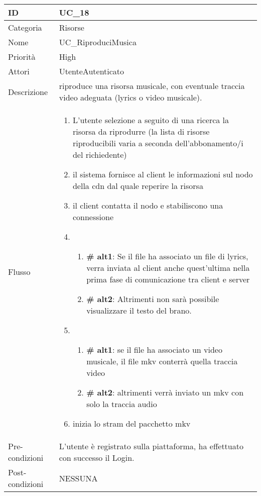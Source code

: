 \begin{center}
\begin{tabular}{ |p{2cm}|p{13cm}|  }
\hline
ID & UC\_18 \\\hline
Categoria & Risorse\\\hline
Nome & UC\_RiproduciMusica\\\hline
Priorità & High \\\hline
Attori &  UtenteAutenticato \\\hline
Descrizione & riproduce una risorsa musicale, con eventuale traccia video adeguata (lyrics o video musicale).\\\hline
Flusso &  	\begin{enumerate}
			\item L'utente selezione a seguito di una ricerca la risorsa da riprodurre (la lista di risorse riproducibili varia a seconda dell'abbonamento/i del richiedente)
			\item il sistema fornisce al client le informazioni sul nodo della cdn dal quale reperire la risorsa 
			\item il client contatta il nodo e stabiliscono una connessione
			\item \begin{enumerate}[label= ]
				\item \textbf{\# alt1}: Se il file ha associato un file di lyrics, verra inviata al client anche quest'ultima nella prima fase di comunicazione tra client e server
				\item \textbf{\# alt2}: Altrimenti non sarà possibile visualizzare il testo del brano.
			\end{enumerate}
			\item \begin{enumerate}[label= ]
				\item \textbf{\# alt1}: se il file ha associato un video musicale, il file mkv conterrà quella traccia video
				\item \textbf{\# alt2}: altrimenti verrà inviato un mkv con solo la traccia audio
			\end{enumerate}
			\item inizia lo stram del pacchetto mkv
			\end{enumerate}
			\\\hline
Pre-condizioni & L'utente è registrato sulla piattaforma, ha effettuato con successo il Login.\\\hline
Post-condizioni & NESSUNA\\\hline
\end{tabular}
\label{table_use_case:18}\newline


\end{center}
